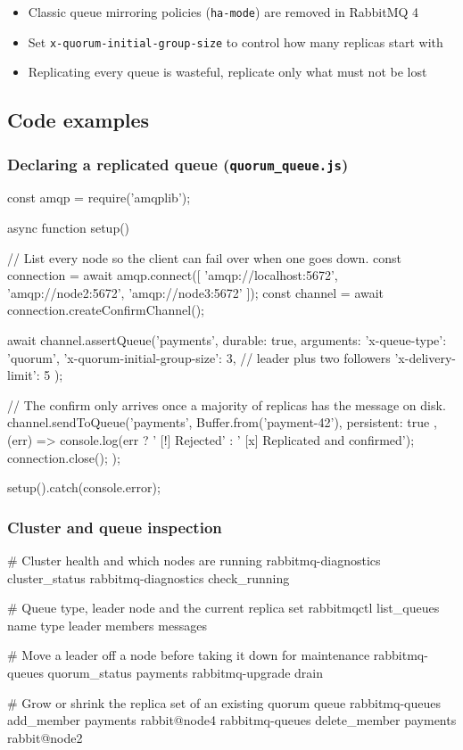 \documentclass[11pt,a4paper]{article}
\begin{document}
\begin{itemize}\itemsep2pt
  \item Classic queue mirroring policies (\lstinline|ha-mode|) are removed in RabbitMQ 4
  \item Set \lstinline|x-quorum-initial-group-size| to control how many replicas start with
  \item Replicating every queue is wasteful, replicate only what must not be lost
\end{itemize}

\newpage
\subsection{Code examples}

\subsubsection*{Declaring a replicated queue (\texttt{quorum\_queue.js})}
\begin{js}[basicstyle=\ttfamily\scriptsize]
const amqp = require('amqplib');

async function setup() {
    // List every node so the client can fail over when one goes down.
    const connection = await amqp.connect([
        'amqp://localhost:5672',
        'amqp://node2:5672',
        'amqp://node3:5672'
    ]);
    const channel = await connection.createConfirmChannel();

    await channel.assertQueue('payments', {
        durable: true,
        arguments: {
            'x-queue-type': 'quorum',
            'x-quorum-initial-group-size': 3,  // leader plus two followers
            'x-delivery-limit': 5
        }
    });

    // The confirm only arrives once a majority of replicas has the message on disk.
    channel.sendToQueue('payments', Buffer.from('payment-42'), { persistent: true },
        (err) => {
            console.log(err ? ' [!] Rejected' : ' [x] Replicated and confirmed');
            connection.close();
        });
}

setup().catch(console.error);
\end{js}

\subsubsection*{Cluster and queue inspection}
\begin{sh}[basicstyle=\ttfamily\scriptsize]
# Cluster health and which nodes are running
rabbitmq-diagnostics cluster_status
rabbitmq-diagnostics check_running

# Queue type, leader node and the current replica set
rabbitmqctl list_queues name type leader members messages

# Move a leader off a node before taking it down for maintenance
rabbitmq-queues quorum_status payments
rabbitmq-upgrade drain

# Grow or shrink the replica set of an existing quorum queue
rabbitmq-queues add_member payments rabbit@node4
rabbitmq-queues delete_member payments rabbit@node2
\end{sh}
\end{document}
